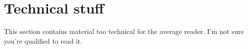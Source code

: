 \chapter{Technical stuff}
This section contains material too technical for the average reader. I'm not sure you're qualified to read it.